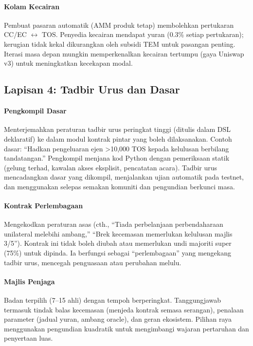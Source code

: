 \documentclass[11pt]{article}
\begin{document}
\paragraph{Kolam Kecairan} Pembuat pasaran automatik (AMM produk tetap) membolehkan pertukaran CC/EC $\leftrightarrow$ TOS. Penyedia kecairan mendapat yuran (0.3\% setiap pertukaran); kerugian tidak kekal dikurangkan oleh subsidi TEM untuk pasangan penting. Iterasi masa depan mungkin memperkenalkan kecairan tertumpu (gaya Uniswap v3) untuk meningkatkan kecekapan modal.

\subsection{Lapisan 4: Tadbir Urus dan Dasar}
\paragraph{Pengkompil Dasar} Menterjemahkan peraturan tadbir urus peringkat tinggi (ditulis dalam DSL deklaratif) ke dalam modul kontrak pintar yang boleh dilaksanakan. Contoh dasar: ``Hadkan pengeluaran ejen >10,000 TOS kepada kelulusan berbilang tandatangan.'' Pengkompil menjana kod Python dengan pemeriksaan statik (gelung terhad, kawalan akses eksplisit, pencatatan acara). Tadbir urus mencadangkan dasar yang dikompil, menjalankan ujian automatik pada testnet, dan menggunakan selepas semakan komuniti dan pengundian berkunci masa.

\paragraph{Kontrak Perlembagaan} Mengekodkan peraturan asas (cth., ``Tiada perbelanjaan perbendaharaan unilateral melebihi ambang,'' ``Brek kecemasan memerlukan kelulusan majlis 3/5''). Kontrak ini tidak boleh diubah atau memerlukan undi majoriti super (75\%) untuk dipinda. Ia berfungsi sebagai ``perlembagaan'' yang mengekang tadbir urus, mencegah penguasaan atau perubahan melulu.

\paragraph{Majlis Penjaga} Badan terpilih (7--15 ahli) dengan tempoh berperingkat. Tanggungjawab termasuk tindak balas kecemasan (menjeda kontrak semasa serangan), penalaan parameter (jadual yuran, ambang oracle), dan geran ekosistem. Pilihan raya menggunakan pengundian kuadratik untuk mengimbangi wajaran pertaruhan dan penyertaan luas.
\end{document}
